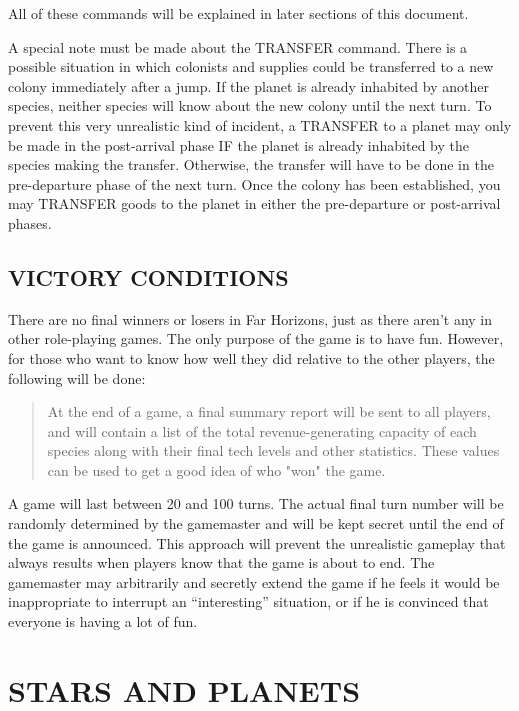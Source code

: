 \documentclass[10pt,titlepage]{article}
\begin{document}
All of these commands will be explained in later sections of this document.


\begin{importantnote}
A special note must be made about the TRANSFER command.  There is a possible
situation in which colonists and supplies could be transferred to a new colony
immediately after a jump.  If the planet is already inhabited by another
species, neither species will know about the new colony until the next turn.
To prevent this very unrealistic kind of incident, a TRANSFER to a planet may
only be made in the post-arrival phase IF the planet is already inhabited by
the species making the transfer.  Otherwise, the transfer will have to be
done in the pre-departure phase of the next turn.  Once the colony has been
established, you may TRANSFER goods to the planet in either the pre-departure
or post-arrival phases.
\end{importantnote}


\subsection{VICTORY CONDITIONS}

There are no final winners or losers in Far Horizons, just as there aren't any
in other role-playing games.  The only purpose of the game is to have fun.
However, for those who want to know how well they did relative to the other
players, the following will be done:

\begin{quotation}
	At the end of a game, a final summary report will be sent to all
	players, and will contain a list of the total revenue-generating
	capacity of each species along with their final tech levels and
	other statistics.  These values can be used to get a good idea
	of who "won" the game.\end{quotation} 

A game will last between 20 and 100 turns.  The actual final turn number will
be randomly determined by the gamemaster and will be kept secret until the end
of the game is announced.  This approach will prevent the unrealistic gameplay
that always results when players know that the game is about to end.  The
gamemaster may arbitrarily and secretly extend the game if he feels it would be
inappropriate to interrupt an ``interesting'' situation, or if he is convinced
that everyone is having a lot of fun.



\section{STARS AND PLANETS}
\end{document}
